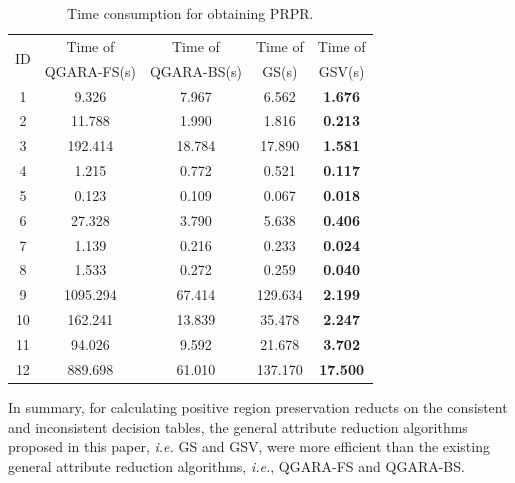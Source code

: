 \documentclass[review]{elsarticle}
\begin{document}
		\begin{table}[htb]
			\centering
			\caption{Time consumption for obtaining PRPR.}
			\label{prprTime}
			\begin{tabular}{ccccc}
				\hline
				\multirow{2}{*}{ID} & Time of     & Time of & Time of     & Time of \\
				& QGARA-FS(s) & QGARA-BS(s)   & GS(s) & GSV(s)  \\ \hline
	      		1   &  9.326     & 7.967  & 6.562   & \textbf{1.676} \\
				2   &  11.788    & 1.990   & 1.816   & \textbf{0.213} \\
				3   &  192.414   & 18.784 & 17.890   & \textbf{1.581} \\
				4   &  1.215     & 0.772  & 0.521   & \textbf{0.117} \\
				5   &  0.123     & 0.109  & 0.067   & \textbf{0.018} \\
				6   &  27.328    & 3.790   & 5.638   & \textbf{0.406} \\
				7   &  1.139     & 0.216  & 0.233   & \textbf{0.024} \\
				8   &  1.533     & 0.272  & 0.259   & \textbf{0.040 } \\
				9   &  1095.294  & 67.414 & 129.634 & \textbf{2.199} \\
				10  &  162.241   & 13.839 & 35.478  & \textbf{2.247} \\
				11  &  94.026    & 9.592  & 21.678  & \textbf{3.702} \\
				12  &  889.698   & 61.010  & 137.170  & \textbf{17.500 } \\ \hline
			\end{tabular}
		\end{table}
		In summary, for calculating positive region preservation reducts on the consistent and inconsistent decision tables, the general attribute reduction algorithms proposed in this paper, \emph{i.e.} GS and GSV, were more efficient than the existing general attribute reduction algorithms, \emph{i.e.}, QGARA-FS and QGARA-BS.
\end{document}
